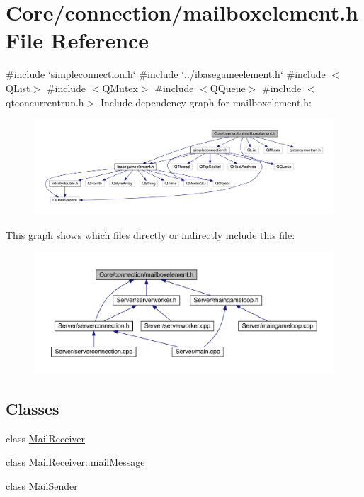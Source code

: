 \hypertarget{a00002}{}\section{Core/connection/mailboxelement.h File Reference}
\label{a00002}
{\ttfamily \#include \char`\"{}simpleconnection.\+h\char`\"{}}\newline
{\ttfamily \#include \char`\"{}../ibasegameelement.\+h\char`\"{}}\newline
{\ttfamily \#include $<$Q\+List$>$}\newline
{\ttfamily \#include $<$Q\+Mutex$>$}\newline
{\ttfamily \#include $<$Q\+Queue$>$}\newline
{\ttfamily \#include $<$qtconcurrentrun.\+h$>$}\newline
Include dependency graph for mailboxelement.\+h\+:
\nopagebreak
\begin{figure}[H]
\begin{center}
\leavevmode
\includegraphics[width=350pt]{d1/d7c/a00003}
\end{center}
\end{figure}
This graph shows which files directly or indirectly include this file\+:
\nopagebreak
\begin{figure}[H]
\begin{center}
\leavevmode
\includegraphics[width=350pt]{d0/d0b/a00004}
\end{center}
\end{figure}
\subsection*{Classes}
\begin{DoxyCompactItemize}
\item 
class \hyperlink{a00197}{Mail\+Receiver}
\item 
class \hyperlink{a00201}{Mail\+Receiver\+::mail\+Message}
\item 
class \hyperlink{a00205}{Mail\+Sender}
\end{DoxyCompactItemize}
